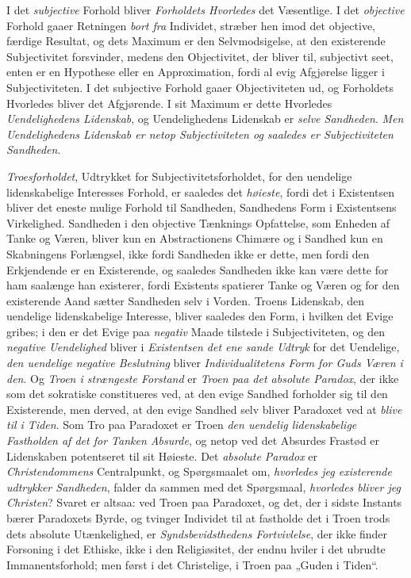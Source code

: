 \documentclass[12pt,a4paper]{book}
\newcommand{\opage}[1]{\marginnote{\footnotesize\textit{[#1]}}}
\begin{document}
I det \emph{subjective} Forhold bliver \emph{Forholdets Hvorledes} det Væsentlige. I
det \emph{objective} Forhold gaaer Retningen \emph{bort fra} Individet, stræber hen
imod det objec\opage{121}tive, færdige Resultat, og dets Maximum er den
Selvmodsigelse, at den existerende Subjectivitet forsvinder, medens den
Objectivitet, der bliver til, subjectivt seet, enten er en Hypothese
eller en Approximation, fordi al evig Afgjørelse ligger i
Subjectiviteten. I det subjective Forhold gaaer Objectiviteten ud, og
Forholdets Hvorledes bliver det Afgjørende. I sit Maximum er dette
Hvorledes \emph{Uendelighedens Lidenskab}, og Uendelighedens Lidenskab er \emph{selve Sandheden}. \emph{Men Uendelighedens Lidenskab er netop Subjectiviteten
og saaledes er Subjectiviteten Sandheden}.

\emph{Troesforholdet}, Udtrykket for Subjectivitetsforholdet, for den
uendelige lidenskabelige Interesses Forhold, er saaledes det \emph{høieste},
fordi det i Existentsen bliver det eneste mulige Forhold til Sandheden,
Sandhedens Form i Existentsens Virkelighed. Sandheden i den objective
Tænknings Opfattelse, som Enheden af Tanke og Væren, bliver kun en
Abstractionens Chimære og i Sandhed kun en Skabningens Forlængsel, ikke
fordi Sandheden ikke er dette, men fordi den Erkjendende er en
Existerende, og saaledes Sandheden ikke kan være dette for ham saalænge
han existerer, fordi Existents spatierer Tanke og Væren og for den
existerende Aand sætter Sandheden selv i Vorden. Troens Lidenskab, den
uendelige lidenskabelige Interesse, bliver saaledes den Form, i hvilken
det Evige gribes; i den er det Evige paa \emph{negativ} Maade tilstede i
Subjectiviteten, og den \emph{negative Uendelighed} bliver i \emph{Existentsen det ene sande Udtryk} for det Uendelige, \emph{den uendelige negative Beslutning} bliver \emph{Individualitetens Form for Guds Væren i den}. Og \emph{Troen i strængeste Forstand} er \emph{Troen paa det absolute Paradox}, der ikke som det
sokratiske constitueres ved, at den evige Sandhed forholder sig til den
Existerende, men derved, at den evige Sandhed selv bliver Paradoxet ved at \emph{blive til i Tiden}. Som Tro paa Paradoxet er Troen \emph{den uendelig lidenskabelige Fastholden af det for Tanken Absurde}, og netop ved det Absurdes Frastød er Lidenskaben potentseret \opage{122}til sit Høieste. Det \emph{absolute Paradox} er \emph{Christendommens} Centralpunkt, og Spørgsmaalet om,
\emph{hvorledes jeg existerende udtrykker Sandheden}, falder da sammen med det
Spørgsmaal, \emph{hvorledes bliver jeg Christen}? Svaret er altsaa: ved Troen
paa Paradoxet, og det, der i sidste Instants bærer Paradoxets Byrde, og
tvinger Individet til at fastholde det i Troen trods dets absolute
Utænkelighed, er \emph{Syndsbevidsthedens Fortvivlelse}, der ikke finder
Forsoning i det Ethiske, ikke i den Religiøsitet, der endnu hviler i
det ubrudte Immanentsforhold; men først i det Christelige, i Troen paa
„Guden i Tiden“.
\end{document}
